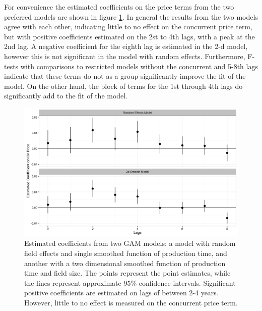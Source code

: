 \documentclass[12pt]{article}
\begin{document}
 
For convenience the estimated coefficients on the price terms from the two preferred models are shown in figure \ref{price_coefficients}. In general the results from the two models agree with each other, indicating little to no effect on the concurrent price term, but with positive coefficients estimated on the 2st to 4th lags, with a peak at the 2nd lag. A negative coefficient for the eighth lag is estimated in the 2-d model, however this is not significant in the model with random effects. Furthermore, F-tests with comparisons to restricted models without the concurrent and 5-8th lags indicate that these terms do not as a group significantly improve the fit of the model. On the other hand, the block of terms for the 1st through 4th lags do significantly add to the fit of the model.

\begin{figure}
	\includegraphics[width=1\textwidth]{figures/price_coefficents.png}
	\caption{Estimated coefficients from two GAM models: a model with random field effects and single smoothed function of production time, and another with a two dimensional smoothed function of production time and field size.  The points represent the point estimates, while the lines represent approximate 95\% confidence intervals. Significant positive coefficients are estimated on lags of between 2-4 years.  However, little to no effect is measured on the concurrent price term.}
	\label{price_coefficients}
\end{figure}
\end{document}

